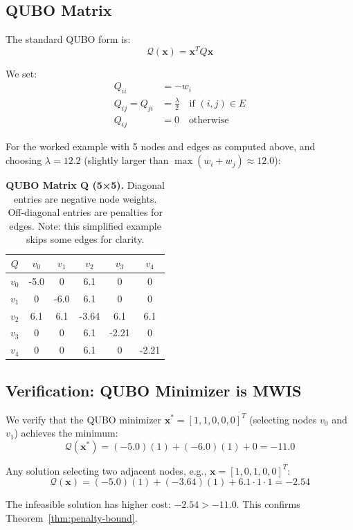 \subsection{QUBO Matrix}

The standard QUBO form is:
\[
\mathcal{Q}(\mathbf{x}) = \mathbf{x}^T Q \mathbf{x}
\]

We set:
\begin{align}
Q_{ii} &= -w_i \\
Q_{ij} = Q_{ji} &= \frac{\lambda}{2} \quad \text{if } (i,j) \in E \\
Q_{ij} &= 0 \quad \text{otherwise}
\end{align}

For the worked example with 5 nodes and edges as computed above, and choosing $\lambda = 12.2$ (slightly larger than $\max(w_i + w_j) \approx 12.0$):

\begin{table}[H]
\centering
\tiny
\begin{tabular}{c|ccccc}
\toprule
$Q$ & $v_0$ & $v_1$ & $v_2$ & $v_3$ & $v_4$ \\
\midrule
$v_0$ & -5.0 & 0 & 6.1 & 0 & 0 \\
$v_1$ & 0 & -6.0 & 6.1 & 0 & 0 \\
$v_2$ & 6.1 & 6.1 & -3.64 & 6.1 & 6.1 \\
$v_3$ & 0 & 0 & 6.1 & -2.21 & 0 \\
$v_4$ & 0 & 0 & 6.1 & 0 & -2.21 \\
\bottomrule
\end{tabular}
\caption{\textbf{QUBO Matrix Q (5×5).} Diagonal entries are negative node weights. Off-diagonal entries are penalties for edges. Note: this simplified example skips some edges for clarity.}
\label{tab:qubo-matrix}
\end{table}

\subsection{Verification: QUBO Minimizer is MWIS}

We verify that the QUBO minimizer $\mathbf{x}^* = [1, 1, 0, 0, 0]^T$ (selecting nodes $v_0$ and $v_1$) achieves the minimum:
\[
\mathcal{Q}(\mathbf{x}^*) = (-5.0)(1) + (-6.0)(1) + 0 = -11.0
\]

Any solution selecting two adjacent nodes, e.g., $\mathbf{x} = [1, 0, 1, 0, 0]^T$:
\[
\mathcal{Q}(\mathbf{x}) = (-5.0)(1) + (-3.64)(1) + 6.1 \cdot 1 \cdot 1 = -2.54
\]

The infeasible solution has higher cost: $-2.54 > -11.0$. This confirms Theorem~\ref{thm:penalty-bound}.

